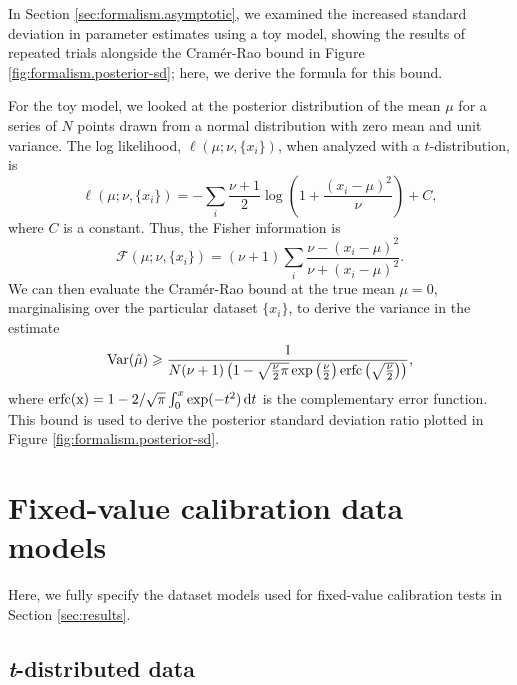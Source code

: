 \documentclass[fleqn,usenatbib]{rasti}
\begin{document}
In Section \ref{sec:formalism.asymptotic}, we examined the increased standard
deviation in parameter estimates using a toy model, showing the results of
repeated trials alongside the Cram\'er-Rao bound \citep{Rao:1945, Cramer:1946}
in Figure \ref{fig:formalism.posterior-sd}; here, we derive the formula for this
bound.

For the toy model, we looked at the posterior distribution of the mean $\mu$ for
a series of $N$ points drawn from a normal distribution with zero mean and unit
variance. The log likelihood, $\ell (\mu; \nu, \{x_i\})$, when analyzed with a
$t$-distribution, is
\begin{equation}
    \ell (\mu; \nu, \{x_i\}) = - \sum_i \frac{\nu + 1}{2} \log \left(1 + \frac{(x_i - \mu)^2}{\nu}\right) + C,
\end{equation}
where $C$ is a constant. Thus, the Fisher information is
\begin{equation}
    \mathcal F(\mu; \nu, \{x_i\}) = (\nu + 1) \sum_i \frac{\nu - (x_i - \mu)^2}{\nu + (x_i - \mu)^2}.
\end{equation}
We can then evaluate the Cram\'er-Rao bound at the true mean $\mu = 0$, marginalising over
the particular dataset $\{x_i\}$, to derive the variance in the estimate
\begin{equation}
    {\rm Var}(\hat{\mu}) \geq \frac{1}{N(\nu + 1) \left(1 - \sqrt{\frac\nu2 \pi} \exp\left(\frac\nu2\right) {\rm erfc}\left(\sqrt{\frac\nu2}\right)\right)},
\end{equation}
where ${\rm erfc (x)} = 1 - 2/\sqrt{\pi} \int_0^x \exp(-t^2) \,{\rm d}t$ is the complementary error function.
This bound is used to derive the posterior standard deviation ratio plotted in
Figure \ref{fig:formalism.posterior-sd}.


\section{Fixed-value calibration data models}
\label{sec:data-models}

Here, we fully specify the dataset models used for fixed-value
calibration tests in Section \ref{sec:results}.

\subsection{\textit{t}-distributed data}
\label{sec:data-models.t}
\end{document}
